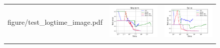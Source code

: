 \begin{figure}[p]
\begin{tabular}{ccc}
\begin{minipage}[t]{0.31\hsize}
            {figure/test_logtime_image.pdf}
        \end{minipage}
        &
        \begin{minipage}[t]{0.31\hsize}
            \centering
            \includegraphics[keepaspectratio, scale=0.30]
            {figure/test_logtime_ringnorm.pdf}
        \end{minipage}
        &
        \begin{minipage}[t]{0.31\hsize}
            \centering
            \includegraphics[keepaspectratio, scale=0.30]
            {figure/test_logtime_splice.pdf}
        \end{minipage}
        \\
        \begin{minipage}[t]{0.31\hsize}
            \centering

\end{minipage}
\end{tabular}
\end{figure}
